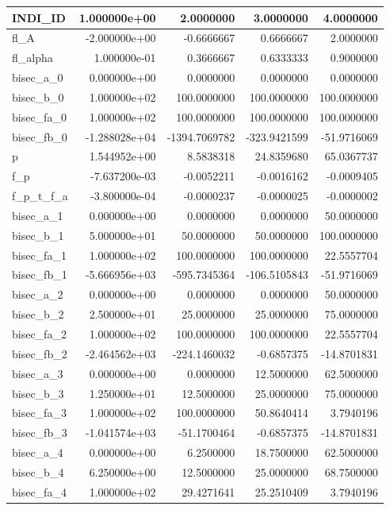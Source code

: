 \documentclass[
]{book}
\begin{document}
\begin{table}[!h]
\centering
\begin{tabular}{l|r|r|r|r}
\hline
INDI\_ID & 1.000000e+00 & 2.0000000 & 3.0000000 & 4.0000000\\
\hline
\rowcolor{gray!6}  fl\_A & -2.000000e+00 & -0.6666667 & 0.6666667 & 2.0000000\\
\hline
fl\_alpha & 1.000000e-01 & 0.3666667 & 0.6333333 & 0.9000000\\
\hline
\rowcolor{gray!6}  bisec\_a\_0 & 0.000000e+00 & 0.0000000 & 0.0000000 & 0.0000000\\
\hline
bisec\_b\_0 & 1.000000e+02 & 100.0000000 & 100.0000000 & 100.0000000\\
\hline
\rowcolor{gray!6}  bisec\_fa\_0 & 1.000000e+02 & 100.0000000 & 100.0000000 & 100.0000000\\
\hline
bisec\_fb\_0 & -1.288028e+04 & -1394.7069782 & -323.9421599 & -51.9716069\\
\hline
\rowcolor{gray!6}  p & 1.544952e+00 & 8.5838318 & 24.8359680 & 65.0367737\\
\hline
f\_p & -7.637200e-03 & -0.0052211 & -0.0016162 & -0.0009405\\
\hline
\rowcolor{gray!6}  f\_p\_t\_f\_a & -3.800000e-04 & -0.0000237 & -0.0000025 & -0.0000002\\
\hline
bisec\_a\_1 & 0.000000e+00 & 0.0000000 & 0.0000000 & 50.0000000\\
\hline
\rowcolor{gray!6}  bisec\_b\_1 & 5.000000e+01 & 50.0000000 & 50.0000000 & 100.0000000\\
\hline
bisec\_fa\_1 & 1.000000e+02 & 100.0000000 & 100.0000000 & 22.5557704\\
\hline
\rowcolor{gray!6}  bisec\_fb\_1 & -5.666956e+03 & -595.7345364 & -106.5105843 & -51.9716069\\
\hline
bisec\_a\_2 & 0.000000e+00 & 0.0000000 & 0.0000000 & 50.0000000\\
\hline
\rowcolor{gray!6}  bisec\_b\_2 & 2.500000e+01 & 25.0000000 & 25.0000000 & 75.0000000\\
\hline
bisec\_fa\_2 & 1.000000e+02 & 100.0000000 & 100.0000000 & 22.5557704\\
\hline
\rowcolor{gray!6}  bisec\_fb\_2 & -2.464562e+03 & -224.1460032 & -0.6857375 & -14.8701831\\
\hline
bisec\_a\_3 & 0.000000e+00 & 0.0000000 & 12.5000000 & 62.5000000\\
\hline
\rowcolor{gray!6}  bisec\_b\_3 & 1.250000e+01 & 12.5000000 & 25.0000000 & 75.0000000\\
\hline
bisec\_fa\_3 & 1.000000e+02 & 100.0000000 & 50.8640414 & 3.7940196\\
\hline
\rowcolor{gray!6}  bisec\_fb\_3 & -1.041574e+03 & -51.1700464 & -0.6857375 & -14.8701831\\
\hline
bisec\_a\_4 & 0.000000e+00 & 6.2500000 & 18.7500000 & 62.5000000\\
\hline
\rowcolor{gray!6}  bisec\_b\_4 & 6.250000e+00 & 12.5000000 & 25.0000000 & 68.7500000\\
\hline
bisec\_fa\_4 & 1.000000e+02 & 29.4271641 & 25.2510409 & 3.7940196\\
\hline
\end{tabular}
\end{table}
\end{document}
